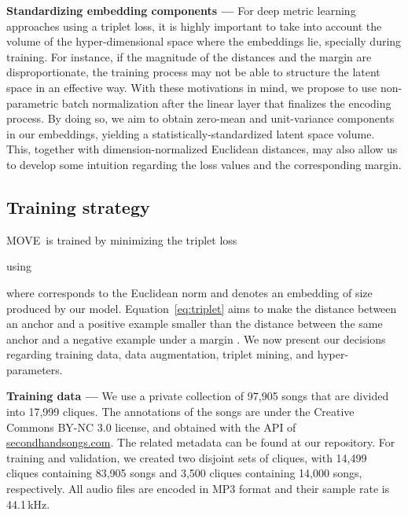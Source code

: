 \documentclass[letterpaper]{article}
\newcommand{\modelname}{MOVE}
\begin{document}
\noindent
\textbf{Standardizing embedding components ---} For deep metric learning approaches using a triplet loss, it is highly important to take into account the volume of the hyper-dimensional space where the embeddings lie, specially during training. For instance, if the magnitude of the distances and the margin are disproportionate, the training process may not be able to structure the latent space in an effective way. With these motivations in mind, we propose to use non-parametric batch normalization after the linear layer that finalizes the encoding process. By doing so, we aim to obtain zero-mean and unit-variance components in our embeddings, yielding a statistically-standardized latent space volume. This, together with dimension-normalized Euclidean distances, may also allow us to develop some intuition regarding the loss values and the corresponding margin.

\subsection{Training strategy}\label{subsec:training_strategy}

\modelname\ is trained by minimizing the triplet loss

using

where  corresponds to the Euclidean norm and   denotes an embedding of size  produced by our model. Equation~\ref{eq:triplet} aims to make the distance between an anchor  and a positive example  smaller than the distance between the same anchor  and a negative example  under a margin . We now present our decisions regarding training data, data augmentation, triplet mining, and hyper-parameters.

\noindent
\textbf{Training data ---} We use a private collection of 97,905 songs that are divided into 17,999 cliques. The annotations of the songs are under the Creative Commons BY-NC 3.0 license, and obtained with the API of \url{secondhandsongs.com}. The related metadata can be found at our repository. For training and validation, we created two disjoint sets of cliques, with 14,499 cliques containing 83,905 songs and 3,500 cliques containing 14,000 songs, respectively. All audio files are encoded in MP3 format and their sample rate is 44.1\,kHz.
\end{document}
